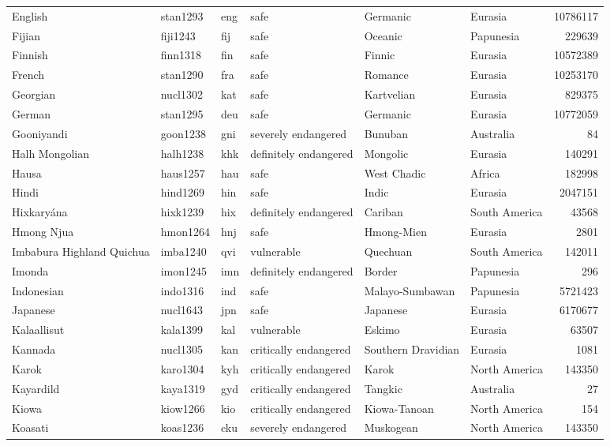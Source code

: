 \begin{longtable}{llllllr}
  English & stan1293 & eng & safe & Germanic & Eurasia & 10786117 \\ 
  Fijian & fiji1243 & fij & safe & Oceanic & Papunesia & 229639 \\ 
  Finnish & finn1318 & fin & safe & Finnic & Eurasia & 10572389 \\ 
  French & stan1290 & fra & safe & Romance & Eurasia & 10253170 \\ 
  Georgian & nucl1302 & kat & safe & Kartvelian & Eurasia & 829375 \\ 
  German & stan1295 & deu & safe & Germanic & Eurasia & 10772059 \\ 
  Gooniyandi & goon1238 & gni & severely endangered & Bunuban & Australia & 84 \\ 
  Halh Mongolian & halh1238 & khk & definitely endangered & Mongolic & Eurasia & 140291 \\ 
  Hausa & haus1257 & hau & safe & West Chadic & Africa & 182998 \\ 
  Hindi & hind1269 & hin & safe & Indic & Eurasia & 2047151 \\ 
  Hixkaryána & hixk1239 & hix & definitely endangered & Cariban & South America & 43568 \\ 
  Hmong Njua & hmon1264 & hnj & safe & Hmong-Mien & Eurasia & 2801 \\ 
  Imbabura Highland Quichua & imba1240 & qvi & vulnerable & Quechuan & South America & 142011 \\ 
  Imonda & imon1245 & imn & definitely endangered & Border & Papunesia & 296 \\ 
  Indonesian & indo1316 & ind & safe & Malayo-Sumbawan & Papunesia & 5721423 \\ 
  Japanese & nucl1643 & jpn & safe & Japanese & Eurasia & 6170677 \\ 
  Kalaallisut & kala1399 & kal & vulnerable & Eskimo & Eurasia & 63507 \\ 
  Kannada & nucl1305 & kan & critically endangered & Southern Dravidian & Eurasia & 1081 \\ 
  Karok & karo1304 & kyh & critically endangered & Karok & North America & 143350 \\ 
  Kayardild & kaya1319 & gyd & critically endangered & Tangkic & Australia & 27 \\ 
  Kiowa & kiow1266 & kio & critically endangered & Kiowa-Tanoan & North America & 154 \\ 
  Koasati & koas1236 & cku & severely endangered & Muskogean & North America & 143350 \\ 

\end{longtable}
